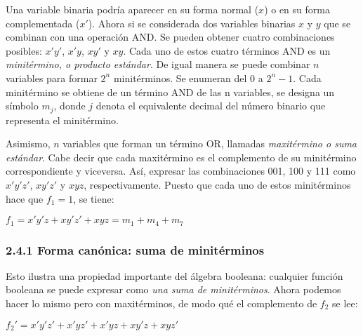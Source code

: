 \documentclass{article}
\begin{document}
Una variable binaria podr\'{i}a aparecer en su forma normal ($x$) o en su forma complementada
($x'$). Ahora si se considerada dos variables binarias $x$ y $y$ que se combinan con una operaci\'{o}n
AND. Se pueden obtener cuatro combinaciones posibles: $x'y'$, $x'y$, $xy'$ y $xy$. Cada uno de
estos cuatro t\'{e}rminos AND es un \textit{minit\'{e}rmino, o producto est\'{a}ndar}. De igual
manera se puede combinar $n$ variables para formar $2^n$ minit\'{e}rminos. Se enumeran del 0 a $2^n - 1$. 
Cada minit\'{e}rmino se obtiene de un t\'{e}rmino AND de las n variables, se designa un s\'{i}mbolo $m_j$,
donde $j$ denota el equivalente decimal del n\'{u}mero binario que representa el minit\'{e}rmino.

Asimismo, $n$ variables que forman un t\'{e}rmino OR, llamadas \textit{maxit\'{e}rmino o suma est\'{a}ndar}.
Cabe decir que cada maxit\'{e}rmino es el complemento de su minit\'{e}rmino correspondiente y viceversa.
As\'{i}, expresar las combinaciones 001, 100 y 111 como $x'y'z'$, $xy'z'$ y $xyz$, respectivamente. Puesto 
que cada uno de estos minit\'{e}rminos hace que $f_1 = 1$, se tiene:
\begin{center}
    $f_1 = x'y'z + xy'z' + xyz = m_1 + m_4 + m_7$ 
\end{center}

\subsubsection*{2.4.1 Forma can\'{o}nica: suma de minit\'{e}rminos}
\begin{flushleft}
    Esto ilustra una propiedad importante del \'{a}lgebra booleana: cualquier funci\'{o}n booleana se puede
    expresar como \textit{una suma de minit\'{e}rminos}. Ahora podemos hacer lo mismo pero con maxit\'{e}rminos,
    de modo qu\'{e} el complemento de $f_2$ se lee:
\end{flushleft}
\begin{center}
    $f_2' = x'y'z' +x'yz' + x'yz + xy'z + xyz'$    
\end{center}
\end{document}
